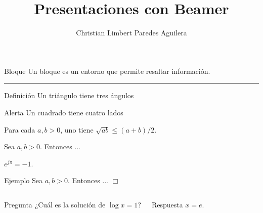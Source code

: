 \documentclass{beamer}
\title[Beamer]{Presentaciones con Beamer}
\author[C. Paredes]{Christian Limbert Paredes Aguilera}
\institute[U.P.V.]
    {Universidad Politécnica de Valencia}
\date{}
\begin{document}
    
    \begin{frame}
	\titlepage
    \end{frame}

    \begin{frame}
	\begin{block}{Bloque}
	    Un {\color{red} bloque} es un entorno que permite resaltar información.
	\end{block}
	\rule{\textwidth}{0.4pt}
	\begin{block}{Definición}
	    Un {\color{orange} triángulo} tiene tres ángulos
	\end{block}
	\begin{alertblock}{Alerta}
	    Un {\color{blue} cuadrado} tiene cuatro lados
	\end{alertblock}
    \end{frame}

    \begin{frame}
	\begin{theorem}[Christian]
	    Para cada $a,b>0$, uno tiene $\sqrt{ab}\leq (a+b)/2$.
	\end{theorem}

	\begin{lemma}
	    Sea $a,b>0$. Entonces ...
	\end{lemma}

	\begin{corollary}[Euler]
	    $e^{j\pi}=-1$.
	\end{corollary}

	\pause

	\begin{exampleblock}{Ejemplo}
	    Sea $a,b>0$. Entonces ... $\Box$
	\end{exampleblock}
    \end{frame}

    \begin{frame}
	\begin{columns}
		\begin{block}{Pregunta}
		    ¿Cuál es la solución de $\log x = 1$?
		\end{block}
		\pause %
		\begin{block}{Respuesta}
		    $x=e$. \phantom{¿ ?} %
		\end{block}
	\end{columns}
    \end{frame}
\end{document}
